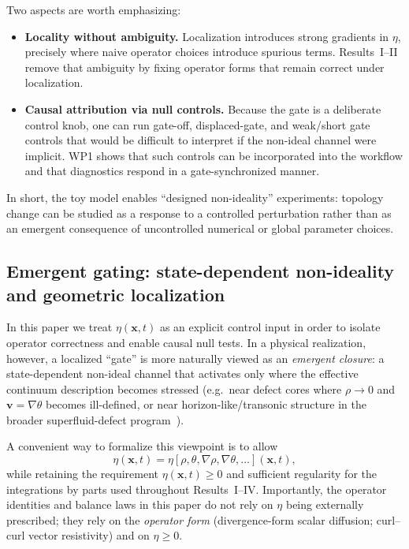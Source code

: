 \documentclass[11pt]{article}
\theoremstyle{plain}
\theoremstyle{definition}
\theoremstyle{remark}
\newcommand{\vfield}{\mathbf{v}}
\begin{document}
Two aspects are worth emphasizing:

\begin{itemize}[leftmargin=*]
  \item \textbf{Locality without ambiguity.}
  Localization introduces strong gradients in $\eta$, precisely where naive operator choices introduce
  spurious terms. Results~I--II remove that ambiguity by fixing operator forms that remain correct under
  localization.

  \item \textbf{Causal attribution via null controls.}
  Because the gate is a deliberate control knob, one can run gate-off, displaced-gate, and weak/short
  gate controls that would be difficult to interpret if the non-ideal channel were implicit. WP1 shows
  that such controls can be incorporated into the workflow and that diagnostics respond in a
  gate-synchronized manner.
\end{itemize}

In short, the toy model enables ``designed non-ideality'' experiments: topology change can be studied
as a response to a controlled perturbation rather than as an emergent consequence of uncontrolled
numerical or global parameter choices.

\subsection{Emergent gating: state-dependent non-ideality and geometric localization}\label{sec:discussion_emergent_gate}
In this paper we treat $\eta(\mathbf{x},t)$ as an explicit control input in order to isolate operator correctness and enable causal null tests. In a physical realization, however, a localized ``gate'' is more naturally viewed as an \emph{emergent closure}: a state-dependent non-ideal channel that activates only where the effective continuum description becomes stressed (e.g.\ near defect cores where $\rho\to 0$ and $\vfield=\nabla\theta$ becomes ill-defined, or near horizon-like/transonic structure in the broader superfluid-defect program~\cite{Norris:Paper6}).

A convenient way to formalize this viewpoint is to allow
\[
\eta(\mathbf{x},t)=\eta\!\left[\rho,\theta,\nabla\rho,\nabla\theta,\ldots\right](\mathbf{x},t),
\]
while retaining the requirement $\eta(\mathbf{x},t)\ge 0$ and sufficient regularity for the integrations by parts used throughout Results~I--IV. Importantly, the operator identities and balance laws in this paper do not rely on $\eta$ being externally prescribed; they rely on the \emph{operator form} (divergence-form scalar diffusion; curl--curl vector resistivity) and on $\eta\ge 0$.
\end{document}
